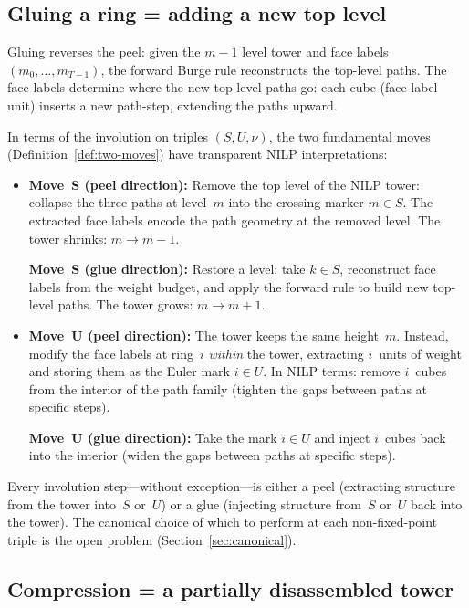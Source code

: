\documentclass[11pt]{article}
\theoremstyle{plain}
\theoremstyle{definition}
\begin{document}
\subsection{Gluing a ring = adding a new top level}

Gluing reverses the peel: given the $m{-}1$ level tower and face
labels $(m_0, \ldots, m_{T-1})$, the forward Burge rule reconstructs
the top-level paths.  The face labels determine where the new
top-level paths go: each cube (face label unit) inserts a new
path-step, extending the paths upward.

In terms of the involution on triples $(S, U, \nu)$, the two
fundamental moves (Definition~\ref{def:two-moves}) have transparent
NILP interpretations:

\begin{itemize}
  \item \textbf{Move~S (peel direction):}
    Remove the top level of the NILP tower: collapse the three paths
    at level~$m$ into the crossing marker $m \in S$.  The extracted
    face labels encode the path geometry at the removed level.
    The tower shrinks: $m \to m-1$.

    \smallskip
    \textbf{Move~S (glue direction):}
    Restore a level: take $k \in S$, reconstruct face labels from the
    weight budget, and apply the forward rule to build new top-level
    paths.  The tower grows: $m \to m+1$.

  \item \textbf{Move~U (peel direction):}
    The tower keeps the same height~$m$.  Instead, modify the face
    labels at ring~$i$ \emph{within} the tower, extracting $i$~units
    of weight and storing them as the Euler mark $i \in U$.
    In NILP terms: remove $i$~cubes from the interior of the path
    family (tighten the gaps between paths at specific steps).

    \smallskip
    \textbf{Move~U (glue direction):}
    Take the mark $i \in U$ and inject $i$~cubes back into the
    interior (widen the gaps between paths at specific steps).
\end{itemize}

\noindent
Every involution step---without exception---is either a peel
(extracting structure from the tower into~$S$ or~$U$) or a glue
(injecting structure from~$S$ or~$U$ back into the tower).  The
canonical choice of which to perform at each non-fixed-point triple
is the open problem (Section~\ref{sec:canonical}).


\subsection{Compression = a partially disassembled tower}
\label{sec:nilp-compression}
\end{document}
